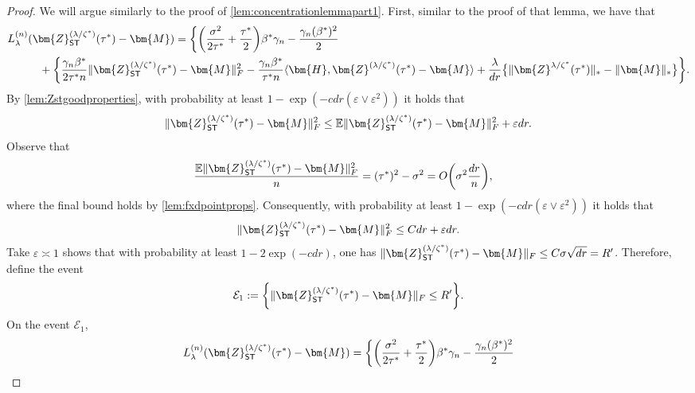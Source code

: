 \documentclass[10pt]{article}
\newcommand{\eps}{\ensuremath{\varepsilon}}
\newcommand{\s}{^*}
\theoremstyle{definition}
\begin{document}
\begin{proof}
We will argue similarly to the proof of \cref{lem:concentrationlemmapart1}. First, similar to the proof of that lemma, we have that 
\begin{align}
    L_{\lambda}^{(n)}&(\bm{Z}_{{\sf ST}}^{(\lambda/\zeta\s)}(\tau\s) - \bm{M} )  = \bigg\{ \bigg( \frac{\sigma^2}{2\tau\s} + \frac{\tau\s}{2} \bigg) \beta\s \gamma_n - \frac{\gamma_n (\beta\s)^2}{2} \\
    &\quad + \bigg\{ \frac{\gamma_n \beta\s}{2\tau\s n} \| \bm{Z}_{{\sf ST}}^{(\lambda/\zeta\s)}(\tau\s) - \bm{M}\|_F^2- \frac{\gamma_n \beta\s}{ \tau\s n} \langle \bm{H}, \bm{Z}^{(\lambda/\zeta\s)}(\tau\s) - \bm{M} \rangle + \frac{\lambda}{dr} \big\{ \| \bm{Z}^{\lambda/\zeta\s}(\tau\s) \|_* - \| \bm{M} \|_* \big\} \bigg\}.
\end{align}
By \cref{lem:Zstgoodproperties}, with probability at least $1 - \exp( - c dr ( \eps \vee \eps^2 ) )$ it holds that
\begin{align}
    \| \bm{Z}_{{\sf ST}}^{(\lambda/\zeta\s)}(\tau\s) - \bm{M} \|_F^2 \leq \mathbb{E} \|  \bm{Z}_{{\sf ST}}^{(\lambda/\zeta\s)}(\tau\s) - \bm{M} \|_F^2 + \eps dr.
\end{align}
Observe that
\begin{align}
    \frac{\mathbb{E} \|  \bm{Z}_{{\sf ST}}^{(\lambda/\zeta\s)}(\tau\s) - \bm{M} \|_F^2}{n} &= (\tau\s)^2 - \sigma^2 = O\bigg(  \sigma^2 \frac{dr}{n}\bigg),
\end{align}
where the final bound holds by \cref{lem:fxdpointprops}.  
Consequently,  with probability at least $1 - \exp( - c dr ( \eps \vee \eps^2 ) )$ it holds that
\begin{align}
      \| \bm{Z}_{{\sf ST}}^{(\lambda/\zeta\s)}(\tau\s) - \bm{M} \|_F^2 \leq C dr + \eps dr.
\end{align}
Take $\eps \asymp 1$ shows that with probability at least $1 - 2\exp( - c dr)$, one has $ \| \bm{Z}_{{\sf ST}}^{(\lambda/\zeta\s)}(\tau\s) - \bm{M} \|_F \leq C \sigma \sqrt{dr} = R'$.  Therefore, define the event
\begin{align}
    \mathcal{E}_1 := \bigg\{  \| \bm{Z}_{{\sf ST}}^{(\lambda/\zeta\s)}(\tau\s) - \bm{M} \|_F \leq R'\bigg\}.
\end{align}
On the event $\mathcal{E}_1$,
\begin{align}
    L_{\lambda}^{(n)}(\bm{Z}_{{\sf ST}}^{(\lambda/\zeta\s)}(\tau\s) - \bm{M} ) &= \bigg\{ \bigg( \frac{\sigma^2}{2\tau\s} + \frac{\tau\s}{2} \bigg) \beta\s \gamma_n - \frac{\gamma_n (\beta\s)^2}{2} \\

\end{align}
\end{proof}
\end{document}
